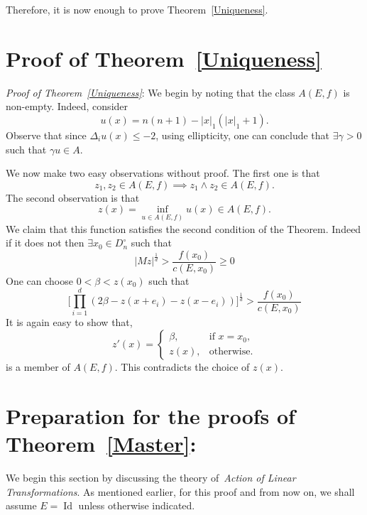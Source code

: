 \documentclass[final]{aomart}
\def\mathscr#1{#1}%
\theoremstyle{plain}
\theoremstyle{definition}
\theoremstyle{remark}
\begin{document}
Therefore, it is now enough to prove Theorem~\ref{Uniqueness}.

\section{Proof of Theorem~\ref{Uniqueness}}
\textit{Proof of Theorem~\ref{Uniqueness}}: We begin by noting that the class $\mathscr{A}(\mathscr{E},f)$ is non-empty. Indeed, consider \[
u(x) = n(n+1) -|x|_1(|x|_1 +1).
\]
Observe that since $\Delta_i u(x) \leq -2$, using ellipticity, one can conclude that $\exists \gamma >0$  such that $\gamma u \in \mathscr{A}$. 


We now make two easy observations without proof. The first one is that \[
z_1,z_2 \in \mathscr{A}(\mathscr{E},f) \implies z_1 \wedge z_2 \in \mathscr{A}(\mathscr{E},f). 
\]
The second observation is that \[
z(x)=\inf_{u \in \mathscr{A}(\mathscr{E},f)} u(x) \in \mathscr{A}(\mathscr{E},f). \]
We claim that this function satisfies the second condition of the Theorem. Indeed if it does not then $\exists x_0 \in D_n^{\circ}$ such that \[
|Mz|^{\frac{1}{d}} > \frac{f(x_0)}{c(\mathscr{E},x_0)} \geq0
\]
One can choose $0<\beta < z(x_0)$ such that \[
\Big[ \prod_{i=1}^d (2\beta - z(x+e_i) -z(x-e_i))\Big]^{\frac{1}{d}} > \frac{f(x_0)}{c(\mathscr{E},x_0)}
\]
It is again easy to show that,
\[
z'(x) =
\begin{cases}
\beta, & \text{if } x = x_0, \\
z(x), & \text{otherwise}.
\end{cases}
\]
is a member of $\mathscr{A}(\mathscr{E},f)$. This contradicts the choice of $z(x)$. 
 
\section{Preparation for the proofs of Theorem~\ref{Master}:}
We begin this section by discussing the theory of~\textit{Action of Linear Transformations}. As mentioned earlier, for this proof and from now on, we shall assume $\mathscr{E} = \operatorname{Id}$ unless otherwise indicated.
\end{document}
